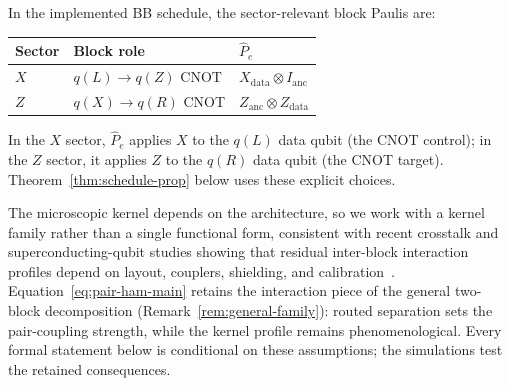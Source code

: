 \documentclass[
aps,
prx,
10pt,
twocolumn,
groupedaddress,
longbibliography,
nofootinbib,
floatfix
]{revtex4-2}
\theoremstyle{definition}
\begin{document}
In the implemented BB schedule, the sector-relevant block Paulis are:
\begin{center}
\footnotesize
\renewcommand{\arraystretch}{1.2}%
\begin{tabular}{lll}
Sector & Block role & $\hat P_e$ \\
\hline
$X$ & $q(L)\to q(Z)$ CNOT & $X_{\mathrm{data}}\otimes I_{\mathrm{anc}}$ \\
$Z$ & $q(X)\to q(R)$ CNOT & $Z_{\mathrm{anc}}\otimes Z_{\mathrm{data}}$ \\
\end{tabular}
\end{center}
In the $X$ sector, $\hat P_e$ applies $X$ to the $q(L)$ data qubit (the CNOT control); in the $Z$ sector, it applies $Z$ to the $q(R)$ data qubit (the CNOT target). Theorem~\ref{thm:schedule-prop} below uses these explicit choices.

The microscopic kernel depends on the architecture, so we work with a kernel family rather than a single functional form, consistent with recent crosstalk and superconducting-qubit studies showing that residual inter-block interaction profiles depend on layout, couplers, shielding, and calibration~\cite{zhou_crosstalk_2025,pettersson_zz_2024,aguila_flux_2025}. Equation~\eqref{eq:pair-ham-main} retains the interaction piece of the general two-block decomposition (Remark~\ref{rem:general-family}): routed separation sets the pair-coupling strength, while the kernel profile remains phenomenological. Every formal statement below is conditional on these assumptions; the simulations test the retained consequences.
\end{document}
